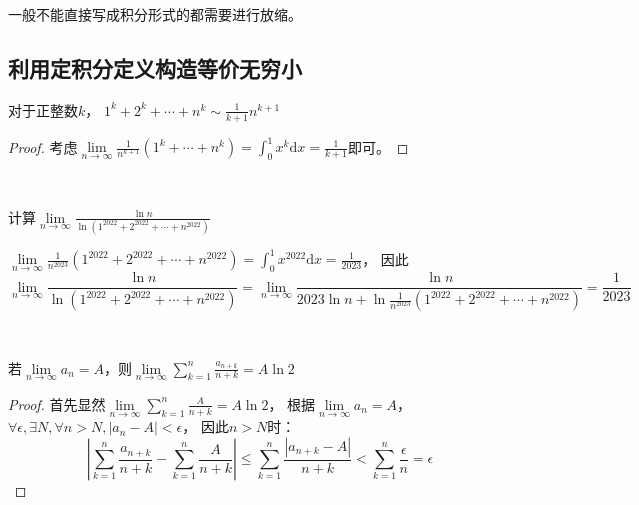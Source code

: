 \begin{note}
  一般不能直接写成积分形式的都需要进行放缩。
\end{note}

\subsection{利用定积分定义构造等价无穷小}

\begin{theorem}[利用积分构造等价无穷小]
  对于正整数$k$，
  $1^k + 2^k + \cdots + n^k \sim \frac{1}{k+1} n^{k+1}$
\end{theorem}

\begin{proof}
  考虑$\lim \limits _{n \rightarrow \infty} \frac{1}{n^{k+1}} \left( 1^k + \cdots + n^k \right) = \int_0^1 x^k \mathrm{d}x = \frac{1}{k+1}$即可。
\end{proof}

~

\begin{exercise}[利用积分构造等价无穷小]
  计算$\lim \limits _{n \rightarrow \infty} \frac{\ln n}{\ln(1^{2022} + 2^{2022} + \cdots + n^{2022})}$
\end{exercise}

\begin{solution}
  $\lim \limits _{n \rightarrow \infty} \frac{1}{n^{2023}} \left(  1^{2022} + 2^{2022} + \cdots + n^{2022} \right) = \int_0^1 x^{2022} \mathrm{d} x  = \frac{1}{2023}$，
  因此
  \begin{equation*}
    \lim \limits _{n \rightarrow \infty} \frac{\ln n}{\ln(1^{2022} + 2^{2022} + \cdots + n^{2022})} =
    \lim \limits _{n \rightarrow \infty} \frac{\ln n}{2023 \ln n + \ln \frac{1}{n^{2023}}(1^{2022}+2^{2022} + \cdots + n^{2022})} = \frac{1}{2023}
  \end{equation*}
\end{solution}

~

\begin{theorem}[已知极限计算求和极限]
  若$\lim \limits _{n \rightarrow \infty} a_n = A$，则$\lim \limits _{n \rightarrow \infty} \sum\limits_{k = 1}^n \frac{a_{n+k}}{n+k} = A \ln 2$
\end{theorem}

\begin{proof}
  首先显然$\lim \limits _{n \rightarrow \infty} \sum\limits_{k = 1}^n \frac{A}{n+k} = A \ln 2$，
  根据$\lim \limits _{n \rightarrow \infty} a_n = A$，
  $\forall \epsilon, \exists N, \forall n > N, |a_n - A| < \epsilon$，
  因此$n > N$时：
  \begin{equation*}
    \left| \sum\limits_{k = 1}^n \frac{a_{n+k}}{n+k} - \sum\limits_{k = 1}^n \frac{A}{n+k} \right| \leq \sum\limits_{k = 1}^n \frac{|a_{n+k} - A|}{n+k} < \sum\limits_{k = 1}^n \frac{\epsilon}{n} = \epsilon
  \end{equation*}
\end{proof}



